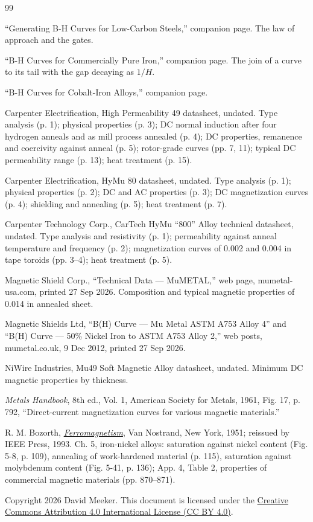 \documentclass[
  11pt,
]{article}
\begin{document}
\begin{thebibliography}{99}\label{references}

 ``Generating B-H Curves for Low-Carbon Steels,'' companion page. The law of approach and the gates.

 ``B-H Curves for Commercially Pure Iron,'' companion page. The join of a curve to its tail with the gap decaying as \(1/H\).

 ``B-H Curves for Cobalt-Iron Alloys,'' companion page.

 Carpenter Electrification, High Permeability 49 datasheet, undated. Type analysis (p. 1); physical properties (p. 3); DC normal induction after four hydrogen anneals and as mill process annealed (p. 4); DC properties, remanence and coercivity against anneal (p. 5); rotor-grade curves (pp. 7, 11); typical DC permeability range (p. 13); heat treatment (p. 15).

 Carpenter Electrification, HyMu 80 datasheet, undated. Type analysis (p. 1); physical properties (p. 2); DC and AC properties (p. 3); DC magnetization curves (p. 4); shielding and annealing (p. 5); heat treatment (p. 7).

 Carpenter Technology Corp., CarTech HyMu ``800'' Alloy technical datasheet, undated. Type analysis and resistivity (p. 1); permeability against anneal temperature and frequency (p. 2); magnetization curves of 0.002 and 0.004 in tape toroids (pp. 3--4); heat treatment (p. 5).

 Magnetic Shield Corp., ``Technical Data --- MuMETAL,'' web page, mumetal-usa.com, printed 27 Sep 2026. Composition and typical magnetic properties of 0.014 in annealed sheet.

 Magnetic Shields Ltd, ``B(H) Curve --- Mu Metal ASTM A753 Alloy 4'' and ``B(H) Curve --- 50\% Nickel Iron to ASTM A753 Alloy 2,'' web posts, mumetal.co.uk, 9 Dec 2012, printed 27 Sep 2026.

 NiWire Industries, Mu49 Soft Magnetic Alloy datasheet, undated. Minimum DC magnetic properties by thickness.

 \emph{Metals Handbook}, 8th ed., Vol. 1, American Society for Metals, 1961, Fig. 17, p. 792, ``Direct-current magnetization curves for various magnetic materials.''

 R. M. Bozorth, \href{https://doi.org/10.1109/9780470544624}{\emph{Ferromagnetism}}, Van Nostrand, New York, 1951; reissued by IEEE Press, 1993. Ch. 5, iron-nickel alloys: saturation against nickel content (Fig. 5-8, p. 109), annealing of work-hardened material (p. 115), saturation against molybdenum content (Fig. 5-41, p. 136); App. 4, Table 2, properties of commercial magnetic materials (pp. 870--871).

\end{thebibliography}

\noindent Copyright 2026 David Meeker. This document is licensed under the \href{https://creativecommons.org/licenses/by/4.0/}{Creative Commons Attribution 4.0 International License (CC BY 4.0)}.
\end{document}
